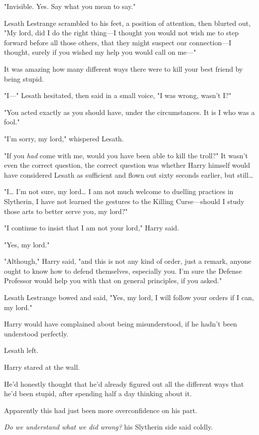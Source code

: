 "Invisible. Yes. Say what you mean to say."

Lesath Lestrange scrambled to his feet, a position of attention, then blurted 
out, "My lord, did I do the right thing---I thought you would not wish me to 
step forward before all those others, that they might suspect our 
connection---I thought, surely if you wished my help you would call on me---"

It was amazing how many different ways there were to kill your best friend by 
being stupid.

"I---" Lesath hesitated, then said in a small voice, "I was wrong, wasn't I?"

"You acted exactly as you should have, under the circumstances. It is I who was 
a fool."

"I'm sorry, my lord," whispered Lesath.

"If you \emph{had} come with me, would you have been able to kill the troll?" 
It wasn't even the correct question, the correct question was whether Harry 
himself would have considered Lesath as sufficient and flown out sixty seconds 
earlier, but still{\ldots}

"I{\ldots} I'm not sure, my lord{\ldots} I am not much welcome to duelling 
practices in Slytherin, I have not learned the gestures to the Killing 
Curse---should I study those arts to better serve you, my lord?"

"I continue to insist that I am not your lord," Harry said.

"Yes, my lord."

"Although," Harry said, "and this is not any kind of order, just a remark, 
anyone ought to know how to defend themselves, especially you. I'm sure the 
Defense Professor would help you with that on general principles, if you asked."

Lesath Lestrange bowed and said, "Yes, my lord, I will follow your orders if I 
can, my lord."

Harry would have complained about being misunderstood, if he hadn't been 
understood perfectly.

Lesath left.

Harry stared at the wall.

He'd honestly thought that he'd already figured out all the different ways that 
he'd been stupid, after spending half a day thinking about it.

Apparently this had just been more overconfidence on his part.

\emph{Do we understand what we did wrong?} his Slytherin side said coldly.

